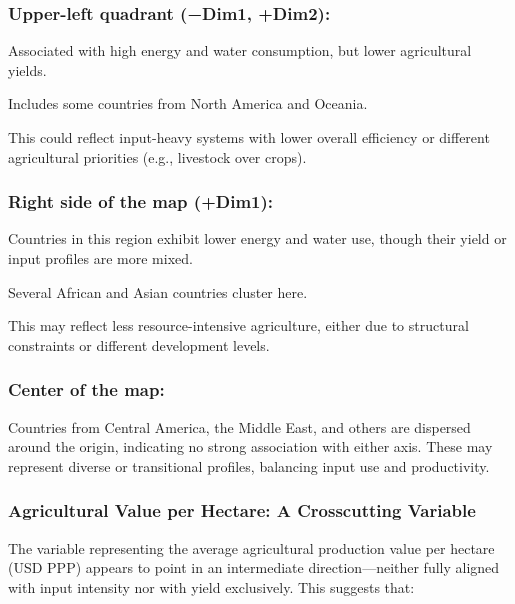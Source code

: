 \documentclass[
]{article}
\begin{document}
\hypertarget{upper-left-quadrant-dim1-dim2}{%
\subsubsection{Upper-left quadrant (−Dim1,
+Dim2):}\label{upper-left-quadrant-dim1-dim2}}

Associated with high energy and water consumption, but lower
agricultural yields.

Includes some countries from North America and Oceania.

This could reflect input-heavy systems with lower overall efficiency or
different agricultural priorities (e.g., livestock over crops).

\hypertarget{right-side-of-the-map-dim1}{%
\subsubsection{Right side of the map
(+Dim1):}\label{right-side-of-the-map-dim1}}

Countries in this region exhibit lower energy and water use, though
their yield or input profiles are more mixed.

Several African and Asian countries cluster here.

This may reflect less resource-intensive agriculture, either due to
structural constraints or different development levels.

\hypertarget{center-of-the-map}{%
\subsubsection{Center of the map:}\label{center-of-the-map}}

Countries from Central America, the Middle East, and others are
dispersed around the origin, indicating no strong association with
either axis. These may represent diverse or transitional profiles,
balancing input use and productivity.

\hypertarget{agricultural-value-per-hectare-a-crosscutting-variable}{%
\subsubsection{Agricultural Value per Hectare: A Crosscutting
Variable}\label{agricultural-value-per-hectare-a-crosscutting-variable}}

The variable representing the average agricultural production value per
hectare (USD PPP) appears to point in an intermediate
direction---neither fully aligned with input intensity nor with yield
exclusively. This suggests that:
\end{document}
